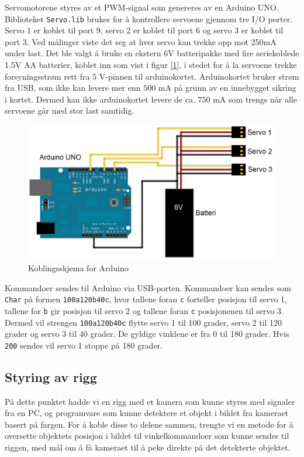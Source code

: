 Servomotorene styres av et PWM-signal som genereres av en Arduino UNO. Biblioteket \texttt{Servo.lib} brukes for å kontrollere servoene gjennom tre I/O porter. Servo 1 er koblet til port 9, servo 2 er koblet til port 6 og servo 3 er koblet til port 3. Ved målinger viste det seg at hver servo kan trekke opp mot 250mA under last. Det ble valgt å bruke en ekstern 6V batteripakke med fire seriekoblede 1.5V AA batterier, koblet inn som vist i figur [\ref{fig:ArduSkjem}], i stedet for å la servoene trekke forsyningsstrøm rett fra $5$ V-pinnen til arduinokortet. Arduinokortet bruker strøm fra USB, som ikke kan levere mer enn $500$ mA på grunn av en innebygget sikring i kortet. Dermed kan ikke arduinokortet levere de ca. $750$ mA som trengs når alle servoene går med stor last samtidig.

\begin{figure}[h!]
	\centering
	\includegraphics[scale=0.25]{img/KoblingsskjemaArduino.png}
	\caption{Koblingsskjema for Arduino}
	\label{fig:ArduSkjem}
\end{figure}  

Kommandoer sendes til Arduino via USB-porten. Kommandoer kan sendes som \texttt{Char} på formen \texttt{100a120b40c}, hvor tallene foran \texttt{c} forteller posisjon til servo 1, tallene for \texttt{b} gir posisjon til servo 2 og tallene foran \texttt{c} posisjonenen til servo 3. Dermed vil strengen \texttt{100a120b40c} flytte servo 1 til 100 grader, servo 2 til 120 grader og servo 3 til 40 grader. De gyldige vinklene er fra 0 til 180 grader. Hvis \texttt{200} sendes vil servo 1 stoppe på 180 grader. 

\subsection{Styring av rigg}

På dette punktet hadde vi en rigg med et kamera som kunne styres med signaler fra en PC, og programvare som kunne detektere et objekt i bildet fra kameraet basert på fargen. For å koble disse to delene sammen, trengte vi en metode for å oversette objektets posisjon i bildet til vinkelkommandoer som kunne sendes til riggen, med mål om å få kameraet til å peke direkte på det detekterte objektet.

